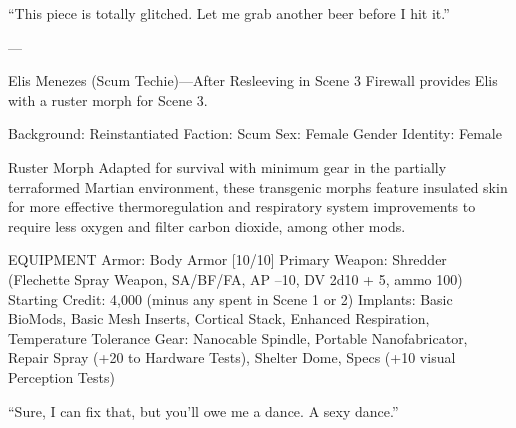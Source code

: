 “This piece is totally glitched. Let me grab another beer before I hit it.”

---

Elis Menezes (Scum Techie)—After Resleeving in Scene 3
Firewall provides Elis with a ruster morph for Scene 3.

Background: Reinstantiated
Faction: Scum
Sex: Female
Gender Identity: Female

Ruster Morph
Adapted for survival with minimum gear in the partially terraformed Martian environment, these transgenic morphs feature insulated skin for more effective thermoregulation and respiratory system improvements to require less oxygen and filter carbon dioxide, among other mods. 

EQUIPMENT
Armor: Body Armor [10/10]
Primary Weapon: Shredder (Flechette Spray Weapon, SA/BF/FA, AP –10, DV 2d10 + 5, ammo 100)
Starting Credit: 4,000 (minus any spent in Scene 1 or 2) 
Implants: Basic BioMods, Basic Mesh Inserts, Cortical Stack, Enhanced Respiration, Temperature Tolerance
Gear: Nanocable Spindle, Portable Nanofabricator, Repair Spray (+20 to Hardware Tests), Shelter Dome, Specs (+10 visual Perception Tests)

“Sure, I can fix that, but you'll owe me a dance. A sexy dance.”


